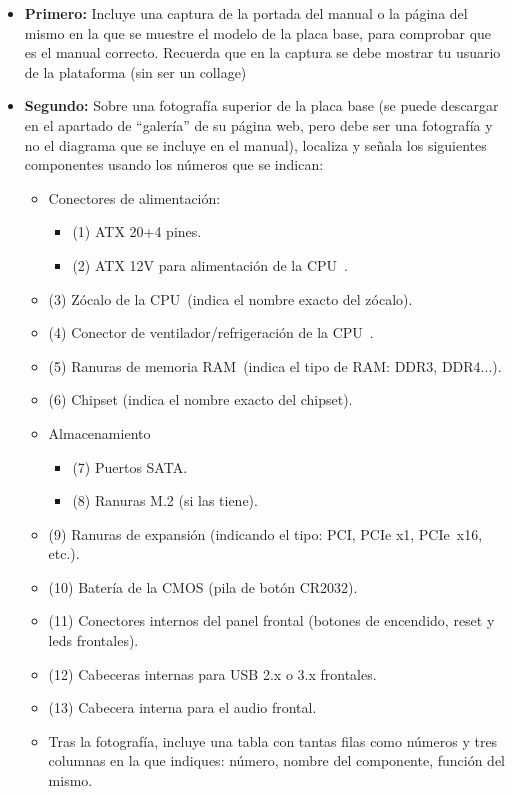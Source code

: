 \begin{itemize}
    \item \textbf{Primero:} Incluye una captura de la portada del manual o la página del mismo en la que se muestre el modelo de la placa base, para comprobar que es el manual correcto. Recuerda que en la captura se debe mostrar tu usuario de la plataforma (sin ser un collage)

    \item \textbf{Segundo:} Sobre una fotografía superior de la placa base (se puede descargar en el apartado de ``galería'' de su página web, pero debe ser una fotografía y no el diagrama que se incluye en el manual), localiza y señala los siguientes componentes usando los números que se indican:
    \begin{itemize}
        \item Conectores de alimentación:
        \begin{itemize}
            \item (1) ATX 20+4 pines.
            \item (2) ATX 12V para alimentación de la CPU .
        \end{itemize}
        \item (3) Zócalo de la CPU (indica el nombre exacto del zócalo).
        \item (4) Conector de ventilador/refrigeración de la CPU .
        \item (5) Ranuras de memoria RAM (indica el tipo de RAM: DDR3, DDR4...).
        \item (6) Chipset (indica el nombre exacto del chipset).
        \item Almacenamiento
        \begin{itemize}
            \item (7) Puertos SATA.
            \item (8) Ranuras M.2 (si las tiene).
        \end{itemize}
        \item (9) Ranuras de expansión (indicando el tipo: PCI, PCIe x1, PCIe x16, etc.).
        \item (10) Batería de la CMOS (pila de botón CR2032).
        \item (11) Conectores internos del panel frontal (botones de encendido, reset y leds frontales).
        \item (12) Cabeceras internas para USB 2.x o 3.x frontales.
        \item (13) Cabecera interna para el audio frontal.
        \item Tras la fotografía, incluye una tabla con tantas filas como números y tres columnas en la que indiques: número, nombre del componente, función del mismo.
    \end{itemize}


\end{itemize}
